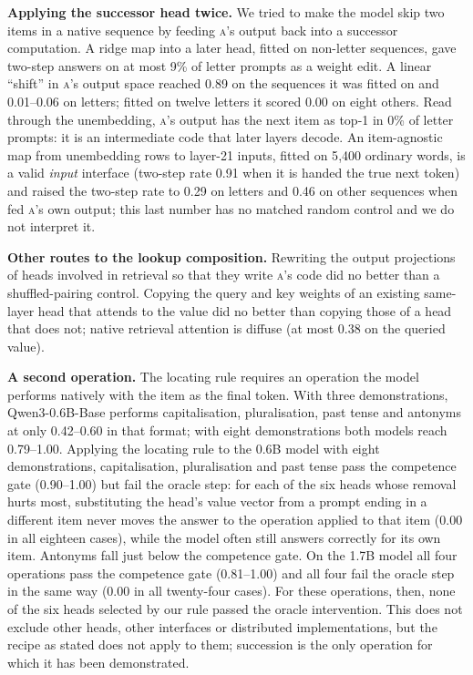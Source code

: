 \documentclass[11pt]{article}
\newcommand{\A}{\textsc{a}}
\begin{document}
\textbf{Applying the successor head twice.} We tried to make the model skip two items in a native sequence by feeding \A's output back into a successor computation. A ridge map into a later head, fitted on non-letter sequences, gave two-step answers on at most 9\% of letter prompts as a weight edit. A linear ``shift'' in \A's output space reached 0.89 on the sequences it was fitted on and 0.01--0.06 on letters; fitted on twelve letters it scored 0.00 on eight others. Read through the unembedding, \A's output has the next item as top-1 in 0\% of letter prompts: it is an intermediate code that later layers decode. An item-agnostic map from unembedding rows to layer-21 inputs, fitted on 5{,}400 ordinary words, is a valid \emph{input} interface (two-step rate 0.91 when it is handed the true next token) and raised the two-step rate to 0.29 on letters and 0.46 on other sequences when fed \A's own output; this last number has no matched random control and we do not interpret it.

\textbf{Other routes to the lookup composition.} Rewriting the output projections of heads involved in retrieval so that they write \A's code did no better than a shuffled-pairing control. Copying the query and key weights of an existing same-layer head that attends to the value did no better than copying those of a head that does not; native retrieval attention is diffuse (at most 0.38 on the queried value).

\textbf{A second operation.} The locating rule requires an operation the model performs natively with the item as the final token. With three demonstrations, Qwen3-0.6B-Base performs capitalisation, pluralisation, past tense and antonyms at only 0.42--0.60 in that format; with eight demonstrations both models reach 0.79--1.00. Applying the locating rule to the 0.6B model with eight demonstrations, capitalisation, pluralisation and past tense pass the competence gate (0.90--1.00) but fail the oracle step: for each of the six heads whose removal hurts most, substituting the head's value vector from a prompt ending in a different item never moves the answer to the operation applied to that item (0.00 in all eighteen cases), while the model often still answers correctly for its own item. Antonyms fall just below the competence gate. On the 1.7B model all four operations pass the competence gate (0.81--1.00) and all four fail the oracle step in the same way (0.00 in all twenty-four cases). For these operations, then, none of the six heads selected by our rule passed the oracle intervention. This does not exclude other heads, other interfaces or distributed implementations, but the recipe as stated does not apply to them; succession is the only operation for which it has been demonstrated.
\end{document}
